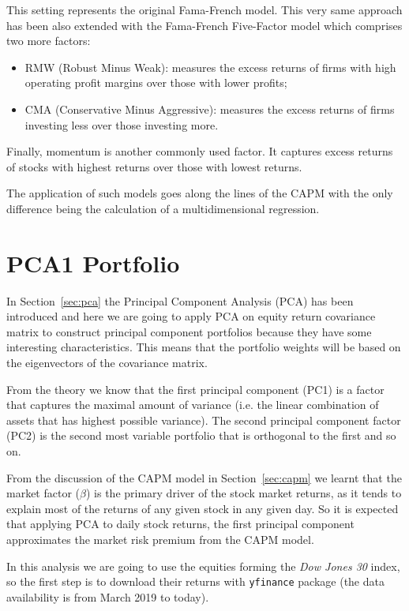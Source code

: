 This setting represents the original Fama-French model. This very same approach has been also extended with the Fama-French Five-Factor model which comprises two more factors:
\begin{itemize}
	\tightlist
\item RMW (Robust Minus Weak): measures the excess returns of firms with high operating profit margins over those with lower profits;
\item CMA (Conservative Minus Aggressive): measures the excess returns of firms investing less over those investing more.
\end{itemize}
Finally, momentum is another commonly used factor. It captures excess returns of stocks with highest returns over those with lowest returns.

The application of such models goes along the lines of the CAPM with the only difference being the calculation of a multidimensional regression.

\section{PCA1 Portfolio}
\label{portfolio-optimization-and-pca}

In Section~\ref{sec:pca} the Principal Component Analysis (PCA) has been introduced and here we are going to apply PCA on equity return covariance matrix to construct principal component portfolios because they have some interesting characteristics. This means that the portfolio weights will be based on the eigenvectors of the covariance matrix.

From the theory we know that the first principal component (PC1) is a factor that captures the maximal amount of variance (i.e. the linear combination of assets that has highest possible variance). The second principal component factor (PC2) is the second most variable portfolio that is orthogonal to the first and so on.

From the discussion of the CAPM model in Section~\ref{sec:capm} we learnt that the market factor ($\beta$) is the primary driver of the stock market returns, as it tends to explain most of the returns of any given stock in any given day.
So it is expected that applying PCA to daily stock returns, the first principal component approximates the market risk premium from the CAPM model.

In this analysis we are going to use the equities forming the \emph{Dow Jones 30} index, so the first step is to download their returns with \texttt{yfinance} package (the data availability is from March 2019 to today).
	
